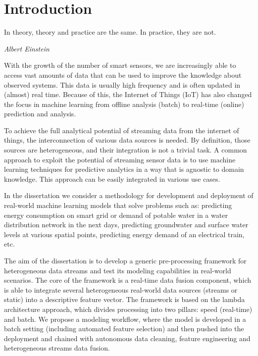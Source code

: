 % 
\chapter{Introduction}
\label{ch:introduction}

\epigraph{In theory, theory and practice are the same. In practice, they are not.}{\textit{Albert Einstein}}

With the growth of the number of smart sensors, we are increasingly able to access vast amounts of data that can be used to improve the knowledge about observed systems. 
This data is usually high frequency and is often updated in (almost) real time.
Because of this, the Internet of Things (IoT) has also changed the focus in machine learning from offline analysis (batch) to real-time (online) prediction and analysis. 

To achieve the full analytical potential of streaming data from the internet of things, the interconnection of various data sources is needed.
By definition, those sources are heterogeneous, and their integration is not a trivial task.
A common approach to exploit the potential of streaming sensor data is to use machine learning techniques for predictive analytics in a way that is agnostic to domain knowledge.
This approach can be easily integrated in various use cases.

In the dissertation we consider a methodology for development and deployment of real-world machine learning models that solve problems such as: predicting energy consumption on smart grid or demand of potable water in a water distribution network in the next days, predicting groundwater and surface water levels at various spatial points, predicting energy demand of an electrical train, etc.

The aim of the dissertation is to develop a generic pre-processing framework for heterogeneous data streams and test its modeling capabilities in real-world scenarios. 
The core of the framework is a real-time data fusion component, which is able to integrate several heterogeneous real-world data sources (streams or static) into a descriptive feature vector. 
The framework is based on the lambda architecture approach, which divides processing into two pillars: speed (real-time) and batch. 
We propose a modeling workflow, where the model is developed in a batch setting (including automated feature selection) and then pushed into the deployment and chained with autonomous data cleaning, feature engineering and heterogeneous streams data fusion. 

